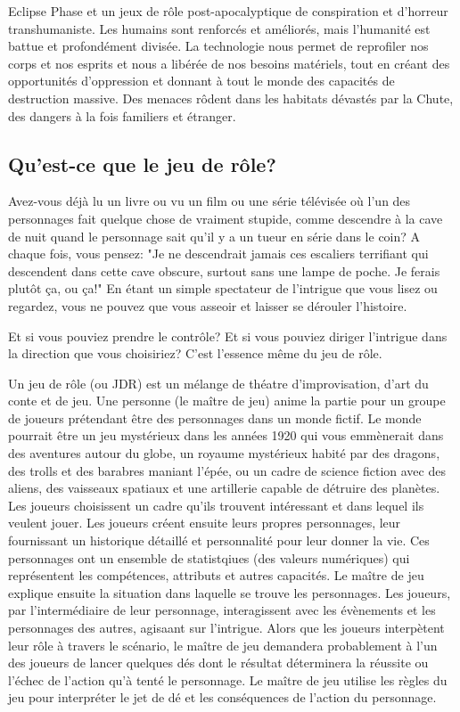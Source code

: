 Eclipse Phase et un jeux de rôle post-apocalyptique de conspiration et d'horreur transhumaniste. Les humains sont renforcés et améliorés, mais l'humanité est battue et profondément divisée. La technologie nous permet de reprofiler nos corps et nos esprits et nous a libérée de nos besoins matériels, tout en créant des opportunités d'oppression et donnant à tout le monde des capacités de destruction massive. Des menaces rôdent dans les habitats dévastés par la Chute, des dangers à la fois familiers et étranger. 



\subsection{Qu'est-ce que le jeu de rôle?} \label{sec:what-roleplaying} 

Avez-vous déjà lu un livre ou vu un film ou une série télévisée où l'un des personnages fait quelque chose de vraiment stupide, comme descendre à la cave de nuit quand le personnage sait qu'il y a un tueur en série dans le coin? A chaque fois, vous pensez: "Je ne descendrait jamais ces escaliers terrifiant qui descendent dans cette cave obscure, surtout sans une lampe de poche. Je ferais plutôt ça, ou ça!" En étant un simple spectateur de l'intrigue que vous lisez ou regardez, vous ne pouvez que vous asseoir et laisser se dérouler l'histoire. 

Et si vous pouviez prendre le contrôle? Et si vous pouviez diriger l'intrigue dans la direction que vous choisiriez? C'est l'essence même du jeu de rôle. 

Un jeu de rôle (ou JDR) est un mélange de théatre d'improvisation, d'art du conte et de jeu. Une personne (le maître de jeu) anime la partie pour un groupe de joueurs prétendant être des personnages dans un monde fictif. Le monde pourrait être un jeu mystérieux dans les années 1920 qui vous emmènerait dans des aventures autour du globe, un royaume mystérieux habité par des dragons, des trolls et des barabres maniant l'épée, ou un cadre de science fiction avec des aliens, des vaisseaux spatiaux et une artillerie capable de détruire des planètes. Les joueurs choisissent un cadre qu'ils trouvent intéressant et dans lequel ils veulent jouer. Les joueurs créent ensuite leurs propres personnages, leur fournissant un historique détaillé et personnalité pour leur donner la vie. Ces personnages ont un ensemble de statistqiues (des valeurs numériques) qui représentent les compétences, attributs et autres capacités. Le maître de jeu explique ensuite la situation dans laquelle se trouve les personnages. Les joueurs, par l'intermédiaire de leur personnage, interagissent avec les évènements et les personnages des autres, agisaant sur l'intrigue. Alors que les joueurs interpètent leur rôle à travers le scénario, le maître de jeu demandera probablement à l'un des joueurs de lancer quelques dés dont le résultat déterminera la réussite ou l'échec de l'action qu'à tenté le personnage. Le maître de jeu utilise les règles du jeu pour interpréter le jet de dé et les conséquences de l'action du personnage. 

